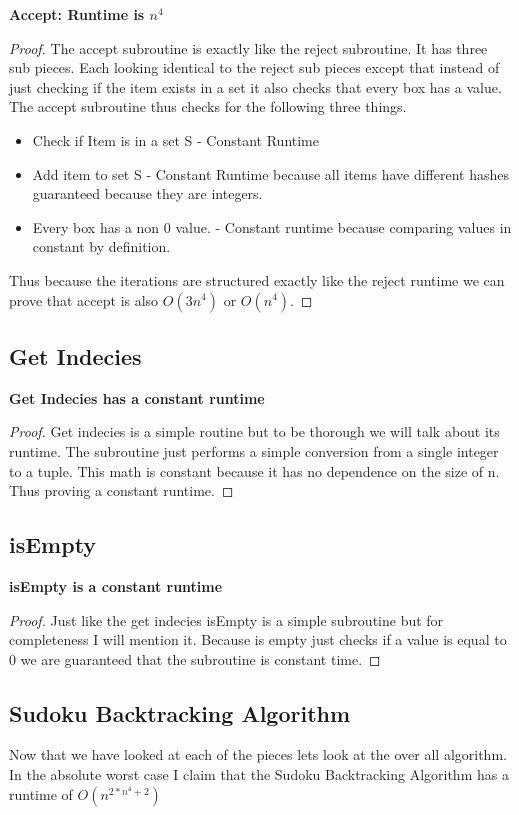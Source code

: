 \documentclass{sig-alternate}
\begin{document}
\textbf{Accept: Runtime is $n^4$}
\begin{proof}
The accept subroutine is exactly like the reject subroutine. It has three sub pieces. Each looking identical to the reject sub pieces except that instead of just checking if the item exists in a set it also checks that every box has a value. The accept subroutine thus checks for the following three things. 

\begin{itemize}
\item{Check if Item is in a set S - Constant Runtime}
\item{Add item to set S - Constant Runtime because all items have different hashes guaranteed because they are integers.}
\item{Every box has a non 0 value. - Constant runtime because comparing values in constant by definition.}
\end{itemize}

Thus because the iterations are structured exactly like the reject runtime we can prove that accept is also $O(3n^4)$ or $O(n^4)$.
\end{proof}

\subsection{Get Indecies}
\textbf{Get Indecies has a constant runtime}
\begin{proof}
Get indecies is a simple routine but to be thorough we will talk about its runtime. The subroutine just performs a simple conversion from a single integer to a tuple. This math is constant because it has no dependence on the size of n. Thus proving a constant runtime. 
\end{proof}

\subsection{isEmpty}
\textbf{isEmpty is a constant runtime}
\begin{proof}
Just like the get indecies isEmpty is a simple subroutine but for completeness I will mention it. Because is empty just checks if a value is equal to 0 we are guaranteed that the subroutine is constant time. 
\end{proof}

\subsection{Sudoku Backtracking Algorithm}
Now that we have looked at each of the pieces lets look at the over all algorithm. In the absolute worst case I claim that the Sudoku Backtracking Algorithm has a runtime of $O(n^{2*n^4 + 2})$
\end{document}
